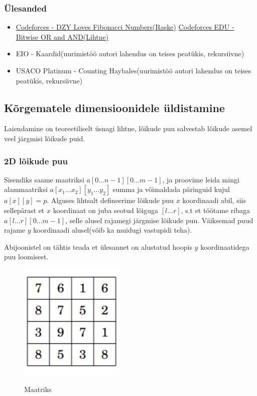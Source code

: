 \documentclass{trkut}
\begin{document}
\subsubsection{Ülesanded}
\begin{itemize}
    \item \href{https://codeforces.com/problemset/problem/446/C}{Codeforces - DZY Loves Fibonacci Numbers(Raske)}
    \href{https://codeforces.com/edu/course/2/lesson/5/2/practice/contest/279653/problem/C}{Codeforces EDU - Bitwise OR and AND(Lihtne)}
    \item EIO - Kaardid(uurimistöö autori lahendus on teises peatükis, rekursiivne)
    \item USACO Platinum - Counting Haybales(uurimistöö autori lahendus on teises peatükis, rekursiivne)
\end{itemize}

\subsection{Kõrgematele dimensioonidele üldistamine}

Laiendamine on teoreetiliselt üsnagi lihtne, lõikude puu salvestab lõikude asemel veel järgmisi lõikude puid.

\subsubsection{2D lõikude puu}
Sisendiks saame maatriksi $a[0...n-1][0...m-1]$, ja proovime leida mingi alammaatriksi $a[x_1...x_2][y_1...y_2]$ summa ja võimaldada päringuid kujul $a[x][y]=p$.
Alguses lihtsalt defineerime lõikude puu $x$ koordinaadi abil, siis sellepärast et $x$ koordinaat on juba seotud lõiguga $[l...r]$, s.t et töötame ribaga $a[l...r][0...m-1]$, selle alusel rajamegi järgmise lõikude puu. Väiksemad puud rajame $y$ koordinaadi alusel(võib ka muidugi vastupidi teha). \parencite{EMaxx}

Abijoonistel on tähtis teada et ülesannet on alustatud hoopis $y$ koordinaatidega puu loomisest\parencite{CPH}.
\begin{figure}[H]%
    \includegraphics[width=5cm]{maatriks.png}%
    \caption{Maatriks}%
    \label{CPH}%
\end{figure}
\end{document}
